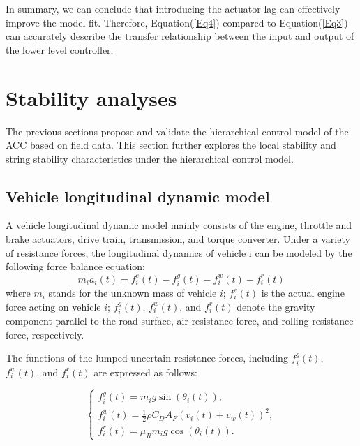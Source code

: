 \documentclass[journal]{IEEEtran}
\begin{document}
In summary, we can conclude that introducing the actuator lag can effectively improve the model fit. Therefore, Equation(\ref{Eq4}) compared to Equation(\ref{Eq3}) can accurately describe the transfer relationship between the input and output of the lower level controller.






\section{Stability analyses}
\label{Section 4}

The previous sections propose and validate the hierarchical control model of the ACC based on field data. This section further explores the local stability and string stability characteristics under the hierarchical control model.

\subsection{Vehicle longitudinal dynamic model}
\label{Section 4.1}

A vehicle longitudinal dynamic model mainly consists of the engine, throttle and brake actuators, drive train, transmission, and torque converter. Under a variety of resistance forces, the longitudinal dynamics of vehicle i can be modeled by the following force balance equation:
\begin{equation}
  m_ia_i(t)=f_i^e(t)-f_i^g(t)-f_i^w(t)-f_i^r(t)
  \label{Eq13}
\end{equation}
where $m_i$ stands for the unknown mass of vehicle $i$; $f_i^e(t)$ is the actual engine force acting on vehicle $i$; $f_i^g(t)$, $f_i^w(t)$, and $f_i^r(t)$ denote the gravity component parallel to the road surface, air resistance force, and rolling resistance force, respectively.

The functions of the lumped uncertain resistance forces, including $f_i^g(t)$, $f_i^w(t)$, and $f_i^r(t)$ are expressed as follows:

\begin{equation}
  \left\{\begin{array}{l}
    f_{i}^{g}(t)=m_{i} g \sin \left(\theta_{i}(t)\right)  ,                       \\
    f_{i}^{w}(t)=\frac{1}{2} \rho C_{D} A_{F}\left(v_{i}(t)+v_{w}(t)\right)^{2} , \\
    f_{i}^{r}(t)=\mu_{R} m_{i} g \cos \left(\theta_{i}(t)\right).
  \end{array}\right.
  \label{Eq14}
\end{equation}
\end{document}
